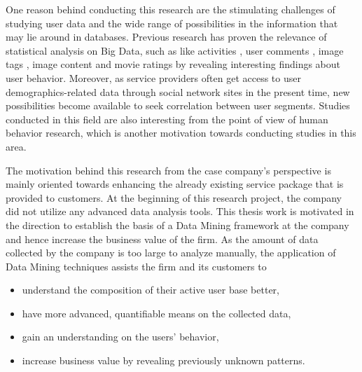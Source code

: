     One reason behind conducting this research are the stimulating challenges of studying user data and the wide range of possibilities in the information that may lie around in databases. Previous research has proven the relevance of statistical analysis on Big Data, such as like activities \cite{jang2015noreciprocity, jang2016teensengagemorewithfewerphotos, ottoni2013ladies, guy2016whatsyourorganizationlike, jang2015no, youyou2015computer}, user comments \cite{jang2016teensengagemorewithfewerphotos}, image tags \cite{jang2016teensengagemorewithfewerphotos}, image content \cite{hu2014we, bakhshi2014faces} and movie ratings \cite{saraee2004data, kabinsingha2012movie} by revealing interesting findings about user behavior. Moreover, as service providers often get access to user demographics-related data through social network sites in the present time, new possibilities become available to seek correlation between user segments. Studies conducted in this field are also interesting from the point of view of human behavior research, which is another motivation towards conducting studies in this area. 

    The motivation behind this research from the case company's perspective is mainly oriented towards enhancing the already existing service package that is provided to customers. At the beginning of this research project, the company did not utilize any advanced data analysis tools. This thesis work is motivated in the direction to establish the basis of a Data Mining framework at the company and hence increase the business value of the firm. As the amount of data collected by the company is too large to analyze manually, the application of Data Mining techniques assists the firm and its customers to 

    \begin{itemize}
        \item understand the composition of their active user base better,
        \item have more advanced, quantifiable means on the collected data,
        \item gain an understanding on the users' behavior, 
        \item increase business value by revealing previously unknown patterns.
    \end{itemize} 

\pagebreak

